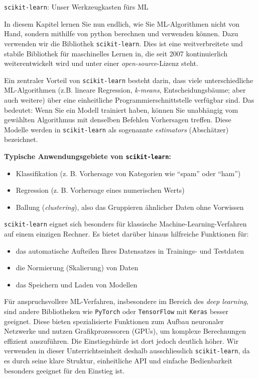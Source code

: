 \begin{lpu}{\texttt{scikit-learn}: Unser Werkzeugkasten fürs ML}
\label{sec:skit}

In diesem Kapitel lernen Sie nun endlich, wie Sie ML-Algorithmen nicht von Hand, sondern mithilfe von python berechnen und verwenden können. Dazu verwenden wir die Bibliothek \texttt{scikit-learn}. Dies ist eine weitverbreitete und stabile Bibliothek für maschinelles Lernen in, die seit 2007 kontinuierlich weiterentwickelt wird und unter einer \textit{open-source}-Lizenz steht.

Ein zentraler Vorteil von \texttt{scikit-learn} besteht darin, dass viele unterschiedliche ML-Algorithmen (z.B. lineare Regression, \textit{k-means}, Entscheidungsbäume; aber auch weitere) über eine einheitliche Programmierschnittstelle verfügbar sind. Das bedeutet: Wenn Sie ein Modell trainiert haben, können Sie unabhängig vom gewählten Algorithmus mit denselben Befehlen Vorhersagen treffen. Diese Modelle werden in \texttt{scikit-learn} als sogenannte \textit{estimators} (Abschätzer) bezeichnet.

\vspace{0.5em}
\textbf{Typische Anwendungsgebiete von \texttt{scikit-learn}:}
\begin{itemize}
  \item Klassifikation (z. B. Vorhersage von Kategorien wie ``spam'' oder ``ham'')
  \item Regression (z. B. Vorhersage eines numerischen Werts)
  \item Ballung (\textit{clustering}), also das Gruppieren ähnlicher Daten ohne Vorwissen
\end{itemize}

\vspace{0.5em}
\texttt{scikit-learn} eignet sich besonders für klassische Machine-Learning-Verfahren auf einem einzigen Rechner. Es bietet darüber hinaus hilfreiche Funktionen für:
\begin{itemize}
  \item das automatische Aufteilen Ihres Datensatzes in Trainings- und Testdaten
  \item die Normierung (Skalierung) von Daten
  \item das Speichern und Laden von Modellen
\end{itemize}

Für anspruchsvollere ML-Verfahren, insbesondere im Bereich des \textit{deep learning}, sind andere Bibliotheken wie \texttt{PyTorch} oder \texttt{TensorFlow} mit \texttt{Keras} besser geeignet. Diese bieten spezialisierte Funktionen zum Aufbau neuronaler Netzwerke und nutzen Grafikprozessoren (GPUs), um komplexe Berechnungen effizient auszuführen. Die Einstiegshürde ist dort jedoch deutlich höher. Wir verwenden in dieser Unterrichtseinheit deshalb ausschliesslich \texttt{scikit-learn}, da es durch seine klare Struktur, einheitliche API und einfache Bedienbarkeit besonders geeignet für den Einstieg ist.


\end{lpu}
